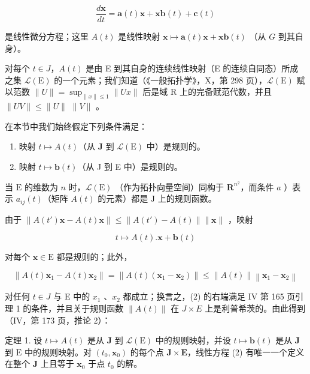 \[
\frac {d \mathbf {x}}{d t} = \mathbf {a} (t) \mathbf {x} + \mathbf {x b} (t) + \mathbf {c} (t)
\]

是线性微分方程；这里 \(A(t)\) 是线性映射 \(\mathbf{x} \mapsto \mathbf{a}(t)\mathbf{x} + \mathbf{x}\mathbf{b}(t)\) （从 \(G\) 到其自身）。

对每个 \(t \in J\)，\(A(t)\) 是由 E 到其自身的连续线性映射（E 的连续自同态）所成之集 \(\mathcal{L}(\mathrm{E})\) 的一个元素；我们知道（《一般拓扑学》，X，第 298 页），\(\mathcal{L}(\mathrm{E})\) 赋以范数 \(\|U\| = \sup_{\|x\| \leqslant 1} \|Ux\|\) 后是域 R 上的完备赋范代数，并且 \(\|UV\| \leqslant \|U\|\) \(\|V\|\) 。

在本节中我们始终假定下列条件满足：

\begin{enumerate}
\def\labelenumi{\alph{enumi})}
\item
  映射 \(t \mapsto A(t)\)（从 \(\mathbf{J}\) 到 \(\mathcal{L}(\mathrm{E})\) 中）是规则的。
\item
  映射 \(t \mapsto \mathbf{b}(t)\)（从 J 到 E 中）是规则的。
\end{enumerate}

当 \(\mathrm{E}\) 的维数为 \(n\) 时，\(\mathcal{L}(\mathrm{E})\) （作为拓扑向量空间）同构于 \(\mathbf{R}^{n^2}\)，而条件 \(a\) ）表示 \(a_{ij}(t)\)（矩阵 \(A(t)\) 的元素）都是 \(\mathrm{J}\) 上的规则函数。

由于 \(\left\| A(t')\mathbf{x} - A(t)\mathbf{x}\right\| \leqslant \left\| A(t') - A(t)\right\| \| \mathbf{x}\|\) ，映射

\[
t \mapsto A (t). \mathbf {x} + \mathbf {b} (t)
\]

对每个 \(\mathbf{x} \in \mathrm{E}\) 都是规则的；此外，

\[
\left\| A (t) \mathbf {x} _ {1} - A (t) \mathbf {x} _ {2} \right\| = \left\| A (t) \left(\mathbf {x} _ {1} - \mathbf {x} _ {2}\right) \right\| \leqslant \left\| A (t) \right\| \left\| \mathbf {x} _ {1} - \mathbf {x} _ {2} \right\|
\]

对任何 \(t \in J\) 与 E 中的 \(x_{1}\) 、\(x_{2}\) 都成立；换言之，(2) 的右端满足 IV 第 165 页引理 1 的条件，并且关于规则函数 \(\|A(t)\|\) 在 \(J \times E\) 上是利普希茨的。由此得到（IV，第 173 页，推论 2）：

定理 1. 设 \(t \mapsto A(t)\) 是从 \(\mathbf{J}\) 到 \(\mathcal{L}(\mathrm{E})\) 中的规则映射，并设 \(t \mapsto \mathbf{b}(t)\) 是从 \(\mathbf{J}\) 到 \(\mathrm{E}\) 中的规则映射。对 \((t_0, \mathbf{x}_0)\) 的每个点 \(\mathbf{J} \times \mathbf{E}\)，线性方程 (2) 有唯一一个定义在整个 \(\mathbf{J}\) 上且等于 \(\mathbf{x}_0\) 于点 \(t_0\) 的解。

